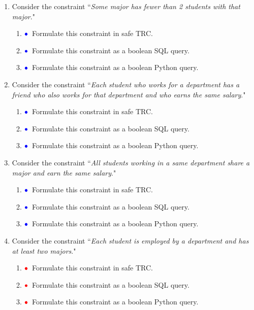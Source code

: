 \documentclass{article}
\newcommand{\red}[1]{{\color{red}#1}}
\newcommand{\blue}[1]{{\color{blue}#1}}
\newcommand{\redbullet}{$\red{\bullet}$}
\newcommand{\bluebullet}{$\blue{\bullet}$}
\begin{document}
\begin{enumerate}[resume]


\item Consider the constraint ``\emph{Some major has fewer than 2 students with that major}."
\begin{enumerate}
\item \bluebullet\ Formulate this constraint in safe TRC.

\item \bluebullet\ Formulate this constraint as a boolean SQL query.

\item \bluebullet\ Formulate this constraint as a boolean Python query.


\end{enumerate}


\item Consider the constraint ``\emph{Each student who works for a department has a friend who also works for that department and who earns the same salary}."
\begin{enumerate}
\item \bluebullet\ Formulate this constraint in safe TRC.



\item \bluebullet\ Formulate this constraint as a boolean SQL query.

\item \bluebullet\ Formulate this constraint as a boolean Python query.

\end{enumerate}


\item Consider the constraint ``\emph{All students working in a same department share a major and earn the same salary}."
\begin{enumerate}
\item \bluebullet\ Formulate this constraint in safe TRC.



\item \bluebullet\ Formulate this constraint as a boolean SQL query.

\item \bluebullet\ Formulate this constraint as a boolean Python query.

\end{enumerate}





\item Consider the constraint ``\emph{Each student is employed by a department and has at least two majors}."
\begin{enumerate}
\item \redbullet\ Formulate this constraint in safe TRC.
\item \redbullet\ Formulate this constraint as a boolean SQL query.
\item \redbullet\ Formulate this constraint as a boolean Python query.
\end{enumerate}


\end{enumerate}
\end{document}
